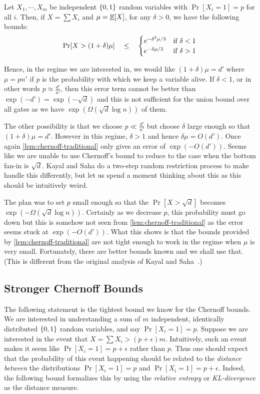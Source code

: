 \begin{lemma}\label{lem:chernoff-traditional}
Let $X_1,\cdots, X_m$ be independent $\left\{0,1\right\}$ random variables with $\Pr[X_i = 1] = p$ for all $i$. Then, if $X = \sum X_i$ and $\mu = \mathop{\mathbb{E}}[X]$, for any $\delta > 0$, we have the following bounds:
\[
\Pr[ X > (1 + \delta) \mu ] \quad \leq \quad \begin{cases}
e^{-\delta^2 \mu/3} & \text{if }\delta < 1\\
e^{-\delta \mu/3} & \text{if }\delta > 1
\end{cases}
\]
\end{lemma}
Hence, in the regime we are interested in, we would like $(1+\delta)\mu = d'$ where $\mu = p n'$ if $p$ is the probability with which we keep a variable alive. If $\delta < 1$, or in other words $p \approx \frac{d'}{n'}$, then this error term cannot be better than $\exp(-d') = \exp(-\sqrt{d})$ and this is not sufficient for the union bound over all gates as we have $\exp(\Omega(\sqrt{d}\log n))$ of them. 

The other possibility is that we choose $p \ll \frac{d'}{n'}$ but choose $\delta$ large enough so that $(1+ \delta)\mu = d'$.
However in this regime, $\delta > 1$ and hence $\delta\mu = O(d')$.
Once again \autoref{lem:chernoff-traditional} only gives an error of $\exp(-O(d'))$. Seems like we are unable to use Chernoff's bound to reduce to the case when the bottom fan-in is $\sqrt{d}$. Kayal and Saha \cite{KayalSaha14} do a two-step random restriction process to make handle this differently, but let us spend a moment thinking about this as this should be intuitively weird. 


The plan was to set $p$ small enough so that the $\Pr[X > \sqrt{d}]$ becomes $\exp(-\Omega(\sqrt{d} \log n))$.
Certainly as we decrease $p$, this probability must go down but this is somehow not seen from \autoref{lem:chernoff-traditional} as the error seems stuck at $\exp(-O(d'))$.
What this shows is that the bounds provided by \autoref{lem:chernoff-traditional} are not tight enough to work in the regime when $\mu$ is very small. Fortunately, there are better bounds known and we shall use that. (This is different from the original analysis of Kayal and Saha~\cite{KayalSaha14}.) 

\subsection{Stronger Chernoff Bounds}

The following statement is the tightest bound we know for the Chernoff bounds.
We are interested in understanding a sum of $m$ independent, identically distributed $\left\{0,1\right\}$ random variables, and say $\Pr[X_i = 1] = p$.
Suppose we are interested in the event that $X = \sum X_i > (p + \epsilon)m$.
Intuitively, such an event makes it seem like $\Pr[X_i = 1] = p+\epsilon$ rather than $p$.
Thus one should expect that the probability of this event happening should be related to the \emph{distance between} the distributions $\Pr[X_i=1]= p$ and $\Pr[X_i = 1] = p+\epsilon$. Indeed, the following bound formalizes this by using the \emph{relative entropy} or \emph{KL-divergence} as the distance measure. 

